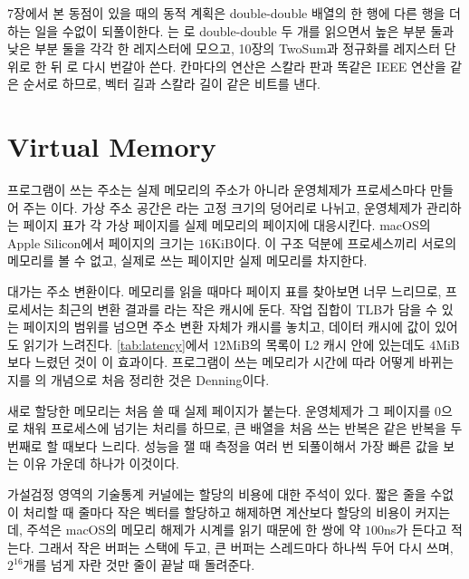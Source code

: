 \begin{instardust}
7장에서 본 동점이 있을 때의 동적 계획은 double-double 배열의 한 행에 다른 행을 더하는 일을 수없이 되풀이한다. 는 로 double-double 두 개를 읽으면서 높은 부분 둘과 낮은 부분 둘을 각각 한 레지스터에 모으고, 10장의 TwoSum과 정규화를 레지스터 단위로 한 뒤 로 다시 번갈아 쓴다. 칸마다의 연산은 스칼라 판과 똑같은 IEEE 연산을 같은 순서로 하므로, 벡터 길과 스칼라 길이 같은 비트를 낸다.
\end{instardust}

\section{Virtual Memory}
\label{sec:virtual-memory}

프로그램이 쓰는 주소는 실제 메모리의 주소가 아니라 운영체제가 프로세스마다 만들어 주는 이다. 가상 주소 공간은 라는 고정 크기의 덩어리로 나뉘고, 운영체제가 관리하는 페이지 표가 각 가상 페이지를 실제 메모리의 페이지에 대응시킨다. macOS의 Apple Silicon에서 페이지의 크기는 $16$KiB이다. 이 구조 덕분에 프로세스끼리 서로의 메모리를 볼 수 없고, 실제로 쓰는 페이지만 실제 메모리를 차지한다.

대가는 주소 변환이다. 메모리를 읽을 때마다 페이지 표를 찾아보면 너무 느리므로, 프로세서는 최근의 변환 결과를 라는 작은 캐시에 둔다. 작업 집합이 TLB가 담을 수 있는 페이지의 범위를 넘으면 주소 변환 자체가 캐시를 놓치고, 데이터 캐시에 값이 있어도 읽기가 느려진다. \cref{tab:latency}에서 $12$MiB의 목록이 L2 캐시 안에 있는데도 $4$MiB보다 느렸던 것이 이 효과이다. 프로그램이 쓰는 메모리가 시간에 따라 어떻게 바뀌는지를 의 개념으로 처음 정리한 것은 Denning이다\cite{denning1968}.

새로 할당한 메모리는 처음 쓸 때 실제 페이지가 붙는다. 운영체제가 그 페이지를 $0$으로 채워 프로세스에 넘기는  처리를 하므로, 큰 배열을 처음 쓰는 반복은 같은 반복을 두 번째로 할 때보다 느리다. 성능을 잴 때 측정을 여러 번 되풀이해서 가장 빠른 값을 보는 이유 가운데 하나가 이것이다.

\begin{instardust}
가설검정 영역의 기술통계 커널에는 할당의 비용에 대한 주석이 있다. 짧은 줄을 수없이 처리할 때 줄마다 작은 벡터를 할당하고 해제하면 계산보다 할당의 비용이 커지는데, 주석은 macOS의 메모리 해제가 시계를 읽기 때문에 한 쌍에 약 $100$ns가 든다고 적는다. 그래서 작은 버퍼는 스택에 두고, 큰 버퍼는 스레드마다 하나씩 두어 다시 쓰며, $2^{16}$개를 넘게 자란 것만 줄이 끝날 때 돌려준다.
\end{instardust}

